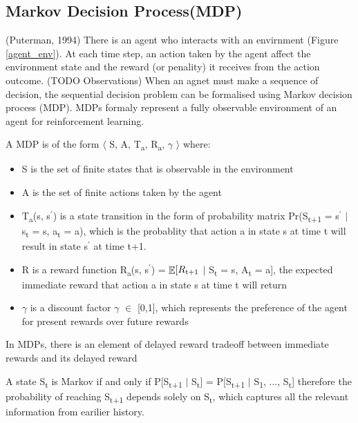 \documentclass[12pt,twoside]{report}
\DeclareMathOperator{\E}{\mathbb{E}}
\begin{document}

\subsection{Markov Decision Process(MDP)}


(Puterman, 1994)
There is an agent who interacts with an envirnment (Figure \ref{agent_env}). At each time step, an action taken by the agent affect the environment state and the reward (or penality) it receives from the action outcome. (TODO Observations)
When an agnet must make a sequence of decision, the sequential decision problem can be formalised using Markov decision process (MDP). MDPs formaly represent a fully observable environment of an agent for reinforcement learning.

A MDP is of the form $\langle$ S, A, T\textsubscript{a}, R\textsubscript{a}, $\gamma$ $\rangle$ where: \\

\begin{itemize}
\item S is the set of finite states that is observable in the environment
\item A is the set of finite actions taken by the agent
\item T\textsubscript{a}(s, s$^\prime$) is a state transition in the form of probability matrix Pr(S\textsubscript{t+1} = s$^\prime$ $\vert$ s\textsubscript{t} = s, a\textsubscript{t} = a), which is the probablity that action a in state s at time t will result in state s$^\prime$ at time t+1.
\item R is a reward function R\textsubscript{a}(s, s$^\prime$) = $\displaystyle \E[R\textsubscript{t+1} $ $\vert$ S\textsubscript{t} = s, A\textsubscript{t} = a], the expected immediate reward that action a in state s at time t will return
\item $\gamma$ is a discount factor $\gamma$ $\in$ [0,1], which represents the preference of the agent for present rewards over future rewards

\end{itemize}

In MDPs, there is an element of delayed reward tradeoff between immediate rewards and its delayed reward

A state S\textsubscript{t} is Markov if and only if
P[S\textsubscript{t+1} $\vert$ S\textsubscript{t}] = P[S\textsubscript{t+1} $\vert$ S\textsubscript{1}, ..., S\textsubscript{t}] therefore the probability of reaching S\textsubscript{t+1} depends solely on S\textsubscript{t}, which captures all the relevant information from earilier history.
\end{document}
